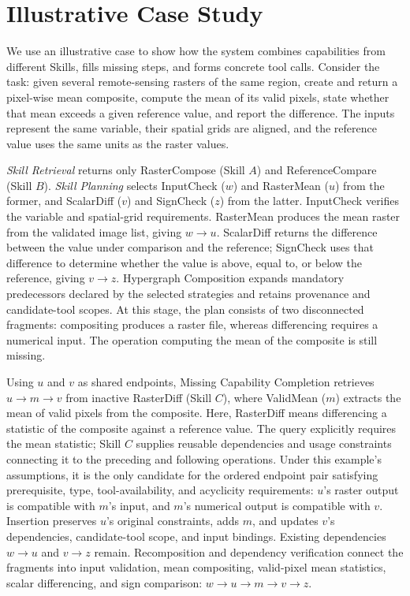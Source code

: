 \section{Illustrative Case Study}
\label{sec:case-study}

We use an illustrative case to show how the system combines capabilities from different Skills, fills missing steps, and forms concrete tool calls. Consider the task: given several remote-sensing rasters of the same region, create and return a pixel-wise mean composite, compute the mean of its valid pixels, state whether that mean exceeds a given reference value, and report the difference. The inputs represent the same variable, their spatial grids are aligned, and the reference value uses the same units as the raster values.



\emph{Skill Retrieval} returns only RasterCompose (Skill $A$) and ReferenceCompare (Skill $B$). \emph{Skill Planning} selects InputCheck ($w$) and RasterMean ($u$) from the former, and ScalarDiff ($v$) and SignCheck ($z$) from the latter. InputCheck verifies the variable and spatial-grid requirements. RasterMean produces the mean raster from the validated image list, giving $w\to u$. ScalarDiff returns the difference between the value under comparison and the reference; SignCheck uses that difference to determine whether the value is above, equal to, or below the reference, giving $v\to z$. Hypergraph Composition expands mandatory predecessors declared by the selected strategies and retains provenance and candidate-tool scopes. At this stage, the plan consists of two disconnected fragments: compositing produces a raster file, whereas differencing requires a numerical input. The operation computing the mean of the composite is still missing.

Using $u$ and $v$ as shared endpoints, Missing Capability Completion retrieves $u\to m\to v$ from inactive RasterDiff (Skill $C$), where ValidMean ($m$) extracts the mean of valid pixels from the composite. Here, RasterDiff means differencing a statistic of the composite against a reference value. The query explicitly requires the mean statistic; Skill $C$ supplies reusable dependencies and usage constraints connecting it to the preceding and following operations. Under this example's assumptions, it is the only candidate for the ordered endpoint pair satisfying prerequisite, type, tool-availability, and acyclicity requirements: $u$'s raster output is compatible with $m$'s input, and $m$'s numerical output is compatible with $v$. Insertion preserves $u$'s original constraints, adds $m$, and updates $v$'s dependencies, candidate-tool scope, and input bindings. Existing dependencies $w\to u$ and $v\to z$ remain. Recomposition and dependency verification connect the fragments into input validation, mean compositing, valid-pixel mean statistics, scalar differencing, and sign comparison: $w\to u\to m\to v\to z$.

